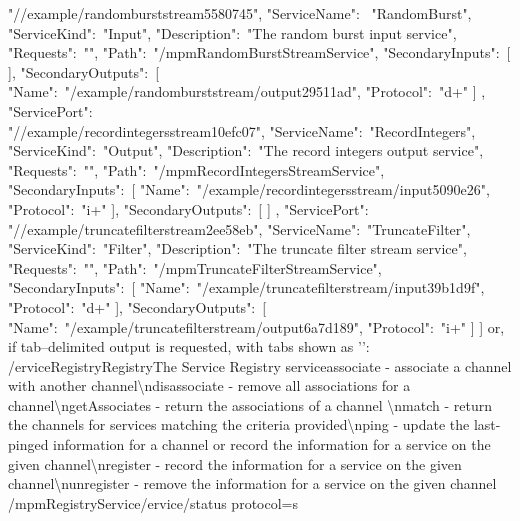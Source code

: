 "/\serviceName/example/randomburststream\textunderscore{}5580745", "ServiceName":\ %
"RandomBurst",\\
"ServiceKind":\ "Input", "Description":\ "The random burst input service",\\
"Requests":\ "", "Path":\ "\textellipsis/mpmRandomBurstStreamService",
"SecondaryInputs":\ [  ], "SecondaryOutputs":\ [ \textbraceleft{}
"Name":\ "/example/randomburststream/output\textunderscore{}29511ad", "Protocol":\ "d+"
\textbraceright{} ] \textbraceright, \textbraceleft{} "ServicePort":\  \\
"/\serviceName/example/recordintegersstream\textunderscore{}10efc07",
"ServiceName":\ "RecordIntegers", "ServiceKind":\ "Output",
"Description":\ "The record integers output service",\\
"Requests":\ "", "Path":\ "\textellipsis/mpmRecordIntegersStreamService",
"SecondaryInputs":\ [ \textbraceleft{}
"Name":\ "/example/recordintegersstream/input\textunderscore{}5090e26", "Protocol":\ "i+"
\textbraceright{} ], "SecondaryOutputs":\ [  ] \textbraceright, \textbraceleft{}
"ServicePort":\ \\
"/\serviceName/example/truncatefilterstream\textunderscore{}2ee58eb",
"ServiceName":\ "TruncateFilter", "ServiceKind":\ "Filter",
"Description":\ "The truncate filter stream service",\\
"Requests":\ "", "Path":\ "\textellipsis/mpmTruncateFilterStreamService",
"SecondaryInputs":\ [ \textbraceleft{}
"Name":\ "/example/truncatefilterstream/input\textunderscore{}39b1d9f", "Protocol":\ "d+"
\textbraceright{} ], "SecondaryOutputs":\ [ \textbraceleft{}
"Name":\ "/example/truncatefilterstream/output\textunderscore{}6a7d189", "Protocol":\ "i+"
\textbraceright{} ] \textbraceright{} ]
\outputEnd{}
or, if tab--delimited output is requested, with tabs shown as
'\texttt{\boldmath{$\vdash$}}':
\outputBegin{}
/\textdollar{}ervice\pseudotab{}Registry\pseudotab{}Registry\pseudotab{}The Service
Registry service\pseudotab{}associate - associate a channel with another
channel\textbackslash{}ndisassociate - remove all associations for a\\
channel\textbackslash{}ngetAssociates - return the associations of a channel
\textbackslash{}nmatch - return the channels for services matching the criteria
provided\textbackslash{}nping - update the last-pinged information for a channel or record
the information for a service on the given channel\textbackslash{}nregister - record the
information for a service on the given\\
channel\textbackslash{}nunregister - remove the information for a service on the given
channel\pseudotab\\
\textellipsis/mpmRegistryService\pseudotwotabs/\textdollar{}ervice/status%
\textbraceleft{}protocol=s\textbraceright\\

